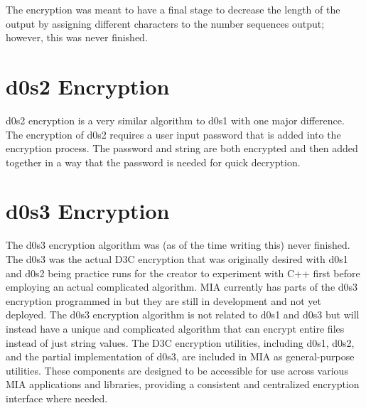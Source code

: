 The encryption was meant to have a final stage to decrease the length of the output by assigning different characters to the number sequences output; however, this was never finished.

\section{d0s2 Encryption}

d0s2 encryption is a very similar algorithm to d0s1 with one major difference. The encryption of d0s2 requires a user input password that is added into the encryption process. The password and string are both encrypted and then added together in a way that the password is needed for quick decryption.

\section{d0s3 Encryption}

The d0s3 encryption algorithm was (as of the time writing this) never finished. The d0s3 was the actual D3C encryption that was originally desired with d0s1 and d0s2 being practice runs for the creator to experiment with C++ first before employing an actual complicated algorithm. MIA currently has parts of the d0s3 encryption programmed in but they are still in development and not yet deployed. The d0s3 encryption algorithm is not related to d0s1 and d0s3 but will instead have a unique and complicated algorithm that can encrypt entire files instead of just string values. The D3C encryption utilities, including d0s1, d0s2, and the partial implementation of d0s3, are included in MIA as general-purpose utilities. These components are designed to be accessible for use across various MIA applications and libraries, providing a consistent and centralized encryption interface where needed.